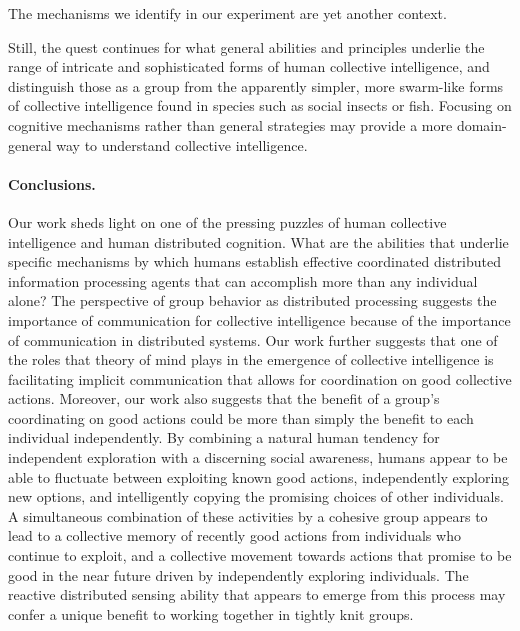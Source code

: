 \documentclass[12pt,letterpaper]{article}
\begin{document}
The mechanisms we identify in our experiment are yet another context.

Still, the quest continues for what general abilities and principles underlie the range of intricate and sophisticated forms of human collective intelligence, and distinguish those as a group from the apparently simpler, more swarm-like forms of collective intelligence found in species such as social insects or fish.  Focusing on cognitive mechanisms rather than general strategies may provide a more domain-general way to understand collective intelligence.

\paragraph{Conclusions.}
Our work sheds light on one of the pressing puzzles of
human collective intelligence and human distributed cognition.  What
are the abilities that underlie specific mechanisms by which humans establish effective
coordinated distributed information processing agents that can
accomplish more than any individual alone?  The perspective of group behavior as
distributed processing \cite{hutchins_cognition_1995} suggests the
importance of communication for collective intelligence because of the
importance of communication in distributed systems.  
Our work further
suggests that one of the roles that theory of mind plays in the
emergence of collective intelligence is facilitating implicit
communication that allows for coordination on good collective actions.
Moreover, our work also suggests that the benefit of a group's
coordinating on good actions could be more than simply the benefit to
each individual independently.  By combining a natural human tendency
for independent exploration with a discerning social awareness, humans
appear to be able to fluctuate between exploiting known good actions,
independently exploring new options, and intelligently copying the
promising choices of other individuals.  A simultaneous combination of
these activities by a cohesive group appears to lead to a collective
memory of recently good actions from individuals who continue to
exploit, and a collective movement towards actions that promise to be
good in the near future driven by independently exploring individuals.
The reactive distributed sensing ability that appears to emerge from
this process may confer a unique benefit to working together in
tightly knit groups.
\end{document}
